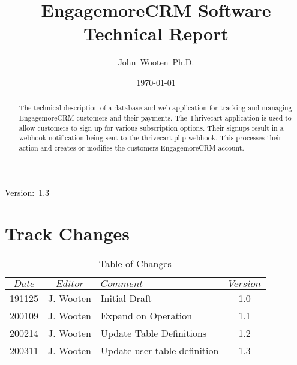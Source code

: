 \documentclass[final,letterpaper,12pt]{article}
\author{John~Wooten~Ph.D.\\
}
\date{\today \\
}
\title{EngagemoreCRM Software Technical Report		}
\begin{document}
\maketitle
\begin{center}
Version:~1.3
\end{center}

\begin {abstract}
\noindent The technical description of a database and web application
for tracking and managing EngagemoreCRM customers and their payments.
The Thrivecart application is used to allow customers to sign up for various
subscription options.  Their signups result in a webhook notification being sent to
the thrivecart.php webhook.  This processes their action and creates or modifies
the customers EngagemoreCRM account.
\end{abstract}
\newpage
\tableofcontents
\newpage
\listoffigures
\listoftables

\newpage
\section{Track Changes}
\begin{table}[h]
\begin{center}
\begin{tabular}{|c|c|l|c|} \hline
$ Date $ & $Editor$ & $Comment$ & $Version$ \\
\hline
191125 & J. Wooten & Initial Draft & 1.0  \\
200109 & J. Wooten & Expand on Operation & 1.1 \\
200214 & J. Wooten & Update Table Definitions & 1.2 \\
200311 & J. Wooten & Update user table definition & 1.3 \\

\hline
\end{tabular}
\end{center}
\caption {Table of Changes}
\label{tab:cqdata0}
\end{table}

\newpage
\end{document}
